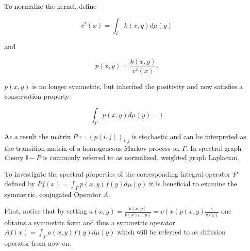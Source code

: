 To normalize the kernel, define
\begin{definition}
$$v^2(x)=\int_\Gamma k(x,y)d\mu(y)$$
\end{definition}
and
\begin{definition}
$$p(x,y)=\frac{k(x,y)}{v^2(x)}.$$
\end{definition}
$p(x,y)$ is no longer symmetric, but inherited the positivity and now satisfies a conservation property:

\begin{equation*}
\int_\Gamma p(x,y)d\mu(y)=1
\end{equation*}

As a result the matrix $P:=(p(i,j))_{i,j}$ is stochastic and can be interpreted as the transition matrix of a homogeneous Markov process on $\Gamma$. In spectral graph theory $\mathbb{I}-P$ is commonly referred to as normalized, weighted graph Laplacian. 


To investigate the spectral properties of the corresponding integral operator $P$ defined by $Pf(x)=\int_\Gamma p(x,y)f(y)d\mu(y)$ it is beneficial to examine the symmetric, conjugated Operator $A$.

First, notice that by setting $a(x,y)=\frac{k(x,y)}{v(x)v(y)}=v(x)p(x,y)\frac{1}{v(y)}$ one obtains a symmetric form and thus a symmetric operator $Af(x)=\int_\Gamma a(x,y)f(y)d\mu(y)$ which will be referred to as diffusion operator from now on.

